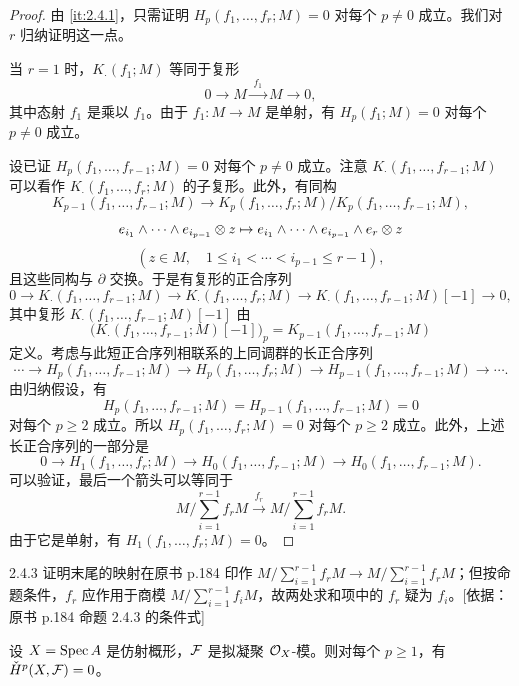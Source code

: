 \begin{proof}
由 \ref{it:2.4.1}，只需证明 $H_p(f_1,\dots,f_r;M)=0$ 对每个 $p\ne 0$ 成立。我们对 $r$ 归纳证明这一点。

当 $r=1$ 时，$K_\cdot(f_1;M)$ 等同于复形
\[
0\to M\xrightarrow{\;f_1\;}M\to 0,
\]
其中态射 $f_1$ 是乘以 $f_1$。由于 $f_1\colon M\to M$ 是单射，有 $H_p(f_1;M)=0$ 对每个 $p\ne 0$ 成立。

设已证 $H_p(f_1,\dots,f_{r-1};M)=0$ 对每个 $p\ne 0$ 成立。注意 $K_\cdot(f_1,\dots,f_{r-1};M)$ 可以看作 $K_\cdot(f_1,\dots,f_r;M)$ 的子复形。此外，有同构
\[
K_{p-1}(f_1,\dots,f_{r-1};M)\to K_p(f_1,\dots,f_r;M)/K_p(f_1,\dots,f_{r-1};M),
\]
\[
e_{i_1}\wedge\cdots\wedge e_{i_{p-1}}\otimes z\mapsto
e_{i_1}\wedge\cdots\wedge e_{i_{p-1}}\wedge e_r\otimes z
\]
\[
(z\in M,\quad 1\le i_1<\cdots<i_{p-1}\le r-1),
\]
且这些同构与 $\partial$ 交换。于是有复形的正合序列
\[
0\to K_\cdot(f_1,\dots,f_{r-1};M)\to K_\cdot(f_1,\dots,f_r;M)\to K_\cdot(f_1,\dots,f_{r-1};M)[-1]\to 0,
\]
其中复形 $K_\cdot(f_1,\dots,f_{r-1};M)[-1]$ 由
\[
\bigl(K_\cdot(f_1,\dots,f_{r-1};M)[-1]\bigr)_p=K_{p-1}(f_1,\dots,f_{r-1};M)
\]
定义。考虑与此短正合序列相联系的上同调群的长正合序列
\[
\cdots\to H_p(f_1,\dots,f_{r-1};M)\to H_p(f_1,\dots,f_r;M)\to H_{p-1}(f_1,\dots,f_{r-1};M)\to\cdots.
\]
由归纳假设，有
\[
H_p(f_1,\dots,f_{r-1};M)=H_{p-1}(f_1,\dots,f_{r-1};M)=0
\]
对每个 $p\ge 2$ 成立。所以 $H_p(f_1,\dots,f_r;M)=0$ 对每个 $p\ge 2$ 成立。此外，上述长正合序列的一部分是
\[
0\to H_1(f_1,\dots,f_r;M)\to H_0(f_1,\dots,f_{r-1};M)\to H_0(f_1,\dots,f_{r-1};M).
\]
可以验证，最后一个箭头可以等同于
\[
M\Big/\sum_{i=1}^{r-1}f_rM\xrightarrow{\;f_r\;}M\Big/\sum_{i=1}^{r-1}f_rM.
\]
由于它是单射，有 $H_1(f_1,\dots,f_r;M)=0$。
\end{proof}

\begin{tnote}
2.4.3 证明末尾的映射在原书 p.184 印作 $M/\sum_{i=1}^{r-1}f_rM\to M/\sum_{i=1}^{r-1}f_rM$；但按命题条件，$f_r$ 应作用于商模 $M/\sum_{i=1}^{r-1}f_iM$，故两处求和项中的 $f_r$ 疑为 $f_i$。[依据：原书 p.184 命题 2.4.3 的条件式]
\end{tnote}

\begin{proposition}\label{it:2.4.4}
设 $X=\operatorname{Spec} A$ 是仿射概形，$\mathcal{F}$ 是拟凝聚 $\mathcal{O}_X$-模。则对每个 $p\ge 1$，有 $\check{H}^p(X,\mathcal{F})=0$。
\end{proposition}

